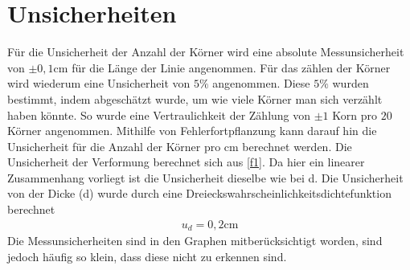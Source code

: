\documentclass[
	a4paper,
	12pt,
	pagesize,
	ngerman
]{scrartcl}
\begin{document}
\section{Unsicherheiten}
Für die Unsicherheit der Anzahl der Körner wird eine absolute Messunsicherheit von $\pm 0,1$cm für die Länge der Linie angenommen. Für das zählen der Körner  wird wiederum eine Unsicherheit von $5\%$ angenommen. Diese $5\%$ wurden bestimmt, indem abgeschätzt wurde, um wie viele Körner man sich verzählt haben könnte. So wurde eine Vertraulichkeit der Zählung von $\pm 1$ Korn pro $20$ Körner angenommen. Mithilfe von Fehlerfortpflanzung kann darauf hin die Unsicherheit für die Anzahl der Körner pro cm berechnet werden. 
Die Unsicherheit der Verformung berechnet sich aus \cref{f1}.
Da hier ein linearer Zusammenhang vorliegt ist die Unsicherheit dieselbe wie bei d. Die Unsicherheit von der Dicke (d) wurde durch eine Dreieckswahrscheinlichkeitsdichtefunktion berechnet 
\begin{align*}
    u_d = 0,2\text{cm}
\end{align*}
Die Messunsicherheiten sind in den Graphen mitberücksichtigt worden, sind jedoch häufig so klein, dass diese nicht zu erkennen sind.
\end{document}
